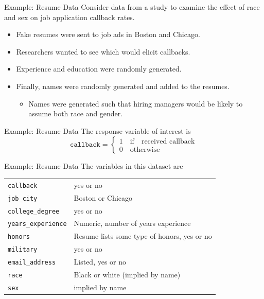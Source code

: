 \begin{frame}{Example: Resume Data}
    Consider data from a study to examine the effect of race and sex on job application callback rates. 
    \begin{itemize}
        \item Fake resumes were sent to job ads in Boston and Chicago.
        \item Researchers wanted to see which would elicit callbacks.
        \item Experience and education were randomly generated.
        \item Finally, names were randomly generated and added to the resumes.
        \begin{itemize}
            \item Names were generated such that hiring managers would be likely to assume both race and gender.
        \end{itemize}
    \end{itemize}
\end{frame}

\begin{frame}{Example: Resume Data}
    The response variable of interest is
    \[
        \texttt{callback} = 
        \begin{cases}
        1 \quad \text{if} \quad \text{received callback} \\
        0 \quad \text{otherwise}
        \end{cases}
    \]
\end{frame}

\begin{frame}{Example: Resume Data}
    The variables in this dataset are
    \begin{table}
    \centering
    \begin{tabular}{ll}
        \texttt{callback} & yes or no  \\
        \texttt{job\_city} & Boston or Chicago \\
        \texttt{college\_degree} & yes or no \\
        \texttt{years\_experience} & Numeric, number of years experience\\
        \texttt{honors} & Resume lists some type of honors, yes or no \\
        \texttt{military} & yes or no \\
        \texttt{email\_address} & Listed, yes or no \\
        \texttt{race} & Black or white (implied by name) \\
        \texttt{sex} & implied by name
    \end{tabular}
    \end{table}
\end{frame}

